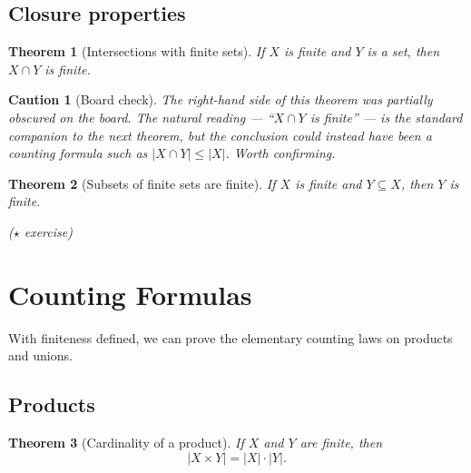 \documentclass[11pt]{article}
\theoremstyle{defstyle}
\theoremstyle{thmstyle}
\newtheorem{theorem}{Theorem}[section]
\theoremstyle{notstyle}
\theoremstyle{cautionstyle}
\newtheorem*{caution}{Caution}
\newcommand{\card}[1]{\lvert #1 \rvert}
\begin{document}
\subsection*{Closure properties}

\begin{thmbox}
\begin{theorem}[Intersections with finite sets]
If $X$ is finite and $Y$ is a set, then $X \cap Y$ is finite.
\end{theorem}
\end{thmbox}

\begin{cautionbox}
\begin{caution}[Board check]
The right-hand side of this theorem was partially obscured on the board.
The natural reading --- ``$X \cap Y$ is finite'' --- is the standard companion
to the next theorem, but the conclusion could instead have been a counting
formula such as $\card{X \cap Y} \leq \card{X}$. Worth confirming.
\end{caution}
\end{cautionbox}

\begin{thmbox}
\begin{theorem}[Subsets of finite sets are finite]
If $X$ is finite and $Y \subseteq X$, then $Y$ is finite.

\hfill ($\star$ exercise)
\end{theorem}
\end{thmbox}

\section{Counting Formulas}

With finiteness defined, we can prove the elementary counting laws on
products and unions.

\subsection*{Products}

\begin{thmbox}
\begin{theorem}[Cardinality of a product]
If $X$ and $Y$ are finite, then
\[
  \card{X \times Y} = \card{X} \cdot \card{Y}.
\]
\end{theorem}
\end{thmbox}
\end{document}
